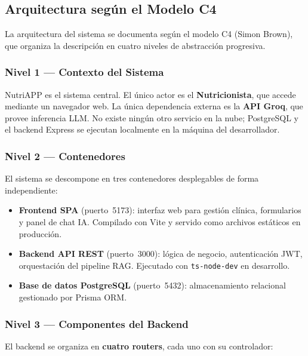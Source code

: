 \documentclass[12pt,a4paper]{article}
\begin{document}
\subsection{Arquitectura según el Modelo C4}

La arquitectura del sistema se documenta según el modelo C4 (Simon Brown), que
organiza la descripción en cuatro niveles de abstracción progresiva.

\subsubsection{Nivel 1 — Contexto del Sistema}

NutriAPP es el sistema central. El único actor es el \textbf{Nutricionista}, que
accede mediante un navegador web. La única dependencia externa es la \textbf{API Groq},
que provee inferencia LLM. No existe ningún otro servicio en la nube; PostgreSQL y
el backend Express se ejecutan localmente en la máquina del desarrollador.

\subsubsection{Nivel 2 — Contenedores}

El sistema se descompone en tres contenedores desplegables de forma independiente:

\begin{itemize}[leftmargin=1.5em]
  \item \textbf{Frontend SPA} (puerto~5173): interfaz web para gestión clínica,
        formularios y panel de chat IA. Compilado con Vite y servido como archivos
        estáticos en producción.
  \item \textbf{Backend API REST} (puerto~3000): lógica de negocio, autenticación JWT,
        orquestación del pipeline RAG. Ejecutado con \texttt{ts-node-dev} en desarrollo.
  \item \textbf{Base de datos PostgreSQL} (puerto~5432): almacenamiento relacional
        gestionado por Prisma ORM.
\end{itemize}

\subsubsection{Nivel 3 — Componentes del Backend}

El backend se organiza en \textbf{cuatro routers}, cada uno con su controlador:
\end{document}

